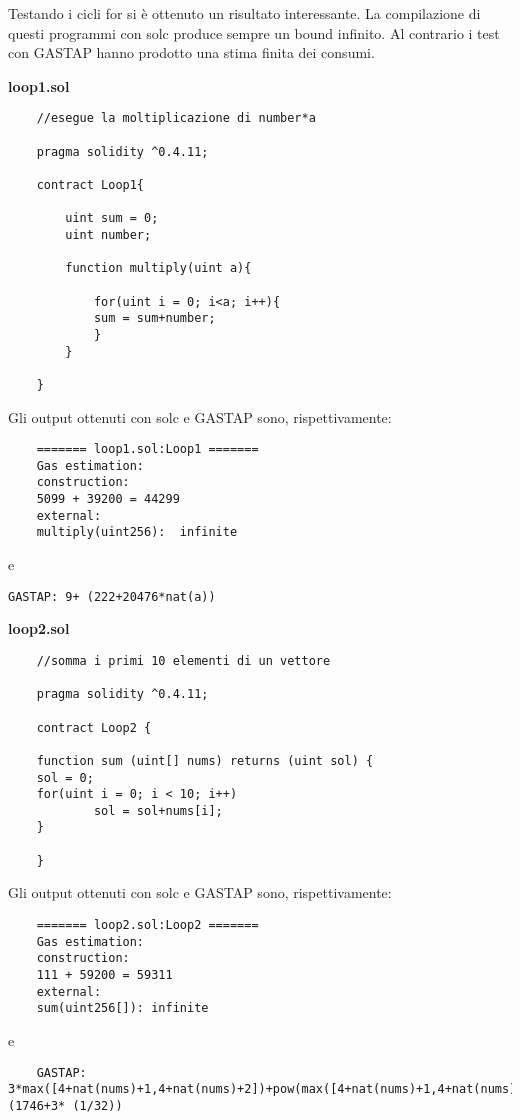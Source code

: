     Testando i cicli for si è ottenuto un risultato interessante. La compilazione di questi programmi con solc produce sempre un bound infinito. Al contrario i test con GASTAP hanno prodotto una stima finita dei consumi.\newline
    
    \begin{description}
    
     \item \textbf{loop1.sol}
     
    \begin{lstlisting}
    //esegue la moltiplicazione di number*a

    pragma solidity ^0.4.11;

    contract Loop1{

        uint sum = 0;
        uint number;
        
        function multiply(uint a){
            
            for(uint i = 0; i<a; i++){
            sum = sum+number;
            }
        }

    }
    \end{lstlisting}
    
    Gli output ottenuti con solc e GASTAP sono, rispettivamente:
    
    \begin{lstlisting}
    ======= loop1.sol:Loop1 =======
    Gas estimation:
    construction:
    5099 + 39200 = 44299
    external:
    multiply(uint256):	infinite
    \end{lstlisting}
    
    e
    
    \verb|GASTAP: 9+ (222+20476*nat(a))|
    

     \item \textbf{loop2.sol}
     
    \begin{lstlisting}
    //somma i primi 10 elementi di un vettore

    pragma solidity ^0.4.11;

    contract Loop2 {

    function sum (uint[] nums) returns (uint sol) {
    sol = 0;
    for(uint i = 0; i < 10; i++)
            sol = sol+nums[i];
    }

    }
    \end{lstlisting}
    
    Gli output ottenuti con solc e GASTAP sono, rispettivamente:
    
    \begin{lstlisting}
    ======= loop2.sol:Loop2 =======
    Gas estimation:
    construction:
    111 + 59200 = 59311
    external:
    sum(uint256[]):	infinite
    \end{lstlisting}
    
    e
    
    \begin{lstlisting}
    GASTAP: 3*max([4+nat(nums)+1,4+nat(nums)+2])+pow(max([4+nat(nums)+1,4+nat(nums)+2]),2)/512+ (1746+3* (1/32))
    \end{lstlisting}
     
    \end{description}


